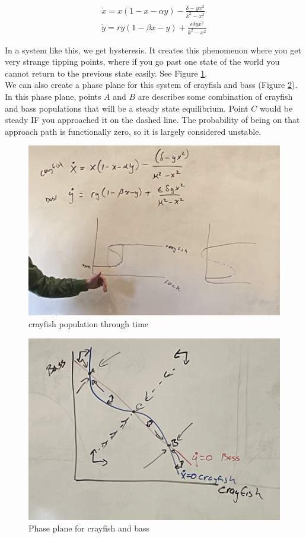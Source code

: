 \documentclass{article}
\begin{document}
\begin{align*}
    \dot x = x (1 - x - \alpha y) - \frac{\delta - yx^2}{k^2 - x^2}\\
    \dot y = ry (1 - \beta x - y) + \frac{\epsilon \delta y x^2 }{k ^2 - x^2}
\end{align*}

In a system like this, we get hysteresis. It creates this phenomenon where you get very strange tipping points, where if you go past one state of the world you cannot return to the previous state easily. See Figure \ref{fig:hyst}.\\

We can also create a phase plane for this system of crayfish and bass (Figure \ref{fig:cb_phase}). In this phase plane, points $A$ and $B$ are describes some combination of crayfish and bass populations that will be a steady state equilibrium. Point $C$ would be steady IF you approached it on the dashed line. The probability of being on that approach path is functionally zero, so it is largely considered unstable. 

\begin{figure}[htp]
    \centering
    \includegraphics[width=0.7\linewidth]{hystor.png}
    \caption{crayfish population through time}
    \label{fig:hyst}
\end{figure}

\begin{figure}[htp]
    \centering
    \includegraphics[width=0.5\linewidth]{Screen Shot 2023-11-15 at 11.36.44 AM.png}
    \caption{Phase plane for crayfish and bass}
    \label{fig:cb_phase}
\end{figure}
\end{document}
